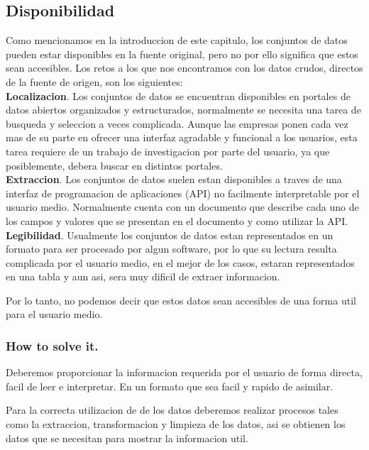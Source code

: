\subsection{Disponibilidad}
    
Como mencionamos en la introduccion de este capitulo, los conjuntos de datos pueden estar disponibles en la fuente original, pero no por
ello significa que estos sean accesibles.
Los retos a los que nos encontramos con los datos crudos, directos de la fuente de origen, son los siguientes:\\
    
 
\textbf{Localizacion}. Los conjuntos de datos se encuentran disponibles en portales de datos abiertos organizados 
y estructurados, normalmente se necesita una tarea de busqueda y seleccion
a veces complicada. Aunque las empresas ponen cada vez mas de su parte en ofrecer una interfaz 
agradable y funcional a los usuarios, esta tarea requiere de un trabajo de investigacion por parte del usuario,
ya que posiblemente, debera buscar en distintos portales.\\

\textbf{Extraccion}. Los conjuntos de datos suelen estan disponibles a traves de una interfaz de programacion 
de aplicaciones (API) no facilmente interpretable por el usuario medio. Normalmente cuenta con 
un documento que describe cada uno de los campos y valores que se presentan en el documento y como utilizar la API.\\

\textbf{Legibilidad}. Usualmente los conjuntos de datos estan representados en un formato para ser procesado por 
algun software, por lo que su lectura resulta complicada por el usuario medio, en el mejor de los casos, 
estaran representados en una tabla y aun asi, sera muy dificil de extraer informacion. 

Por lo tanto, no podemos decir que estos datos sean accesibles de una forma util para el usuario medio.\\

\subsubsection{How to solve it.} 

Deberemos proporcionar la informacion requerida por el usuario de forma directa, facil de leer e interpretar. En un formato
que sea facil y rapido de asimilar.

Para la correcta utilizacion de de los datos deberemos realizar procesos tales como  la extraccion, transformacion y 
limpieza de los datos, asi se obtienen los datos que se necesitan para mostrar la informacion util. 
 
